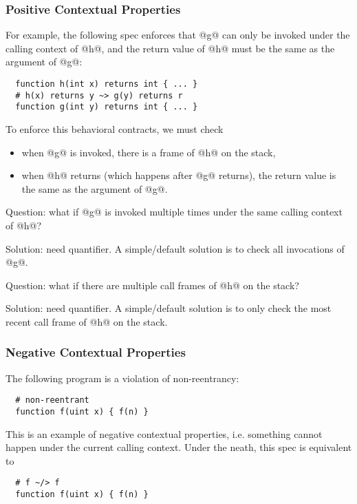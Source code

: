 \subsubsection{Positive Contextual Properties}

For example, the following spec enforces that @g@ can only be invoked
under the calling context of @h@, and the return value of @h@ must be
the same as the argument of @g@:

\begin{lstlisting}
  function h(int x) returns int { ... }
  # h(x) returns y ~> g(y) returns r
  function g(int y) returns int { ... }
\end{lstlisting}

To enforce this behavioral contracts, we must check
\begin{itemize}
	\item when @g@ is invoked, there is a frame of @h@ on the stack,
	\item when @h@ returns (which happens after @g@ returns), the return value
	      is the same as the argument of @g@.
\end{itemize}

Question: what if @g@ is invoked multiple times under the same calling context of
@h@?

Solution: need quantifier. A simple/default solution is to check all
invocations of @g@.

Question: what if there are multiple call frames of @h@ on the stack?

Solution: need quantifier. A simple/default solution is to only check
the most recent call frame of @h@ on the stack.


\subsubsection{Negative Contextual Properties}

The following program is a violation of non-reentrancy:

\begin{lstlisting}
  # non-reentrant
  function f(uint x) { f(n) }
\end{lstlisting}

This is an example of negative contextual properties, i.e. something cannot
happen under the current calling context. Under the neath, this spec is
equivalent to

\begin{lstlisting}
  # f ~/> f
  function f(uint x) { f(n) }
\end{lstlisting}

